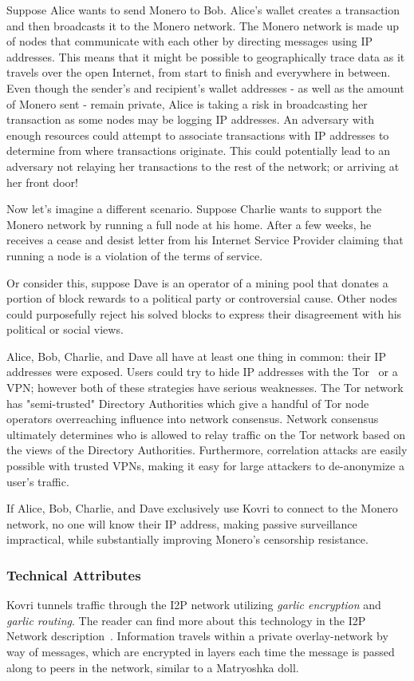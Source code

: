 Suppose Alice wants to send Monero to Bob. Alice's wallet creates a transaction and then broadcasts it to the Monero network. The Monero network is made up of nodes that communicate with each other by directing messages using IP addresses. This means that it might be possible to geographically trace data as it travels over the open Internet, from start to finish and everywhere in between. Even though the sender's and recipient's wallet addresses - as well as the amount of Monero sent - remain private, Alice is taking a risk in broadcasting her transaction as some nodes may be logging IP addresses. An adversary with enough resources could attempt to associate transactions with IP addresses to determine from where transactions originate. This could potentially lead to an adversary not relaying her transactions to the rest of the network; or arriving at her front door!

Now let’s imagine a different scenario. Suppose Charlie wants to support the Monero network by running a full node at his home. After a few weeks, he receives a cease and desist letter from his Internet Service Provider claiming that running a node is a violation of the terms of service.

Or consider this, suppose Dave is an operator of a mining pool that donates a portion of block rewards to a political party or controversial cause. Other nodes could purposefully reject his solved blocks to express their disagreement with his political or social views.
\pagebreak

Alice, Bob, Charlie, and Dave all have at least one thing in common: their IP addresses were exposed. Users could try to hide IP addresses with the Tor~\cite{tor} or a VPN; however both of these strategies have serious weaknesses. The Tor network has "semi-trusted" Directory Authorities which give a handful of Tor node operators overreaching influence into network consensus. Network consensus ultimately determines who is allowed to relay traffic on the Tor network based on the views of the Directory Authorities. Furthermore, correlation attacks are easily possible with trusted VPNs, making it easy for large attackers to de-anonymize a user's traffic.

If Alice, Bob, Charlie, and Dave exclusively use Kovri to connect to the Monero network, no one will know their IP address, making passive surveillance impractical, while substantially improving Monero's censorship resistance.

\subsubsection{Technical Attributes}
Kovri tunnels traffic through the I2P network utilizing \emph{garlic encryption} and \emph{garlic routing}. The reader can find more about this technology in the I2P Network description~\cite{i2p}. Information travels within a private overlay-network by way of messages, which are encrypted in layers each time the message is passed along to peers in the network, similar to a Matryoshka doll.

